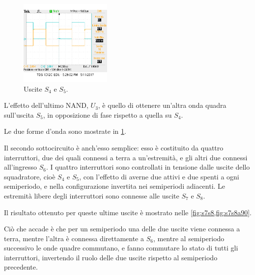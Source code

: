 \documentclass[a4paper,10pt]{article}
\begin{document}
\begin{figure}
	\vspace{-10pt}
	\centering
	\includegraphics[width=0.4\textwidth]{../grafici/s4s5.png}
	\vspace{-12pt}
	\caption{Uscite $ S_4 $ e $ S_5 $.}
	\label{fig:s4s5}
	\vspace{-12pt}
\end{figure}

\noindent L'effetto dell'ultimo NAND, $ U_3 $, è quello di ottenere un'altra onda quadra sull'uscita $ S_5 $, in opposizione di fase rispetto a quella su $ S_4 $.

Le due forme d'onda sono mostrate in \cref{fig:s4s5}.
\newline

Il secondo sottocircuito è anch'esso semplice: esso è costituito da quattro interruttori, due dei quali connessi a terra a un'estremità, e gli altri due connessi all'ingresso $ S_6 $.
I quattro interruttori sono controllati in tensione dalle uscite dello squadratore, cioè $ S_4 $ e $ S_5 $, con l'effetto di averne due attivi e due spenti a ogni semiperiodo, e nella configurazione invertita nei semiperiodi adiacenti.
Le estremità libere degli interruttori sono connesse alle uscite $ S_7 $ e $ S_8 $.
\newline

Il risultato ottenuto per queste ultime uscite è mostrato nelle \cref{fig:s7s8,fig:s7s8a90}.

Ciò che accade è che per un semiperiodo una delle due uscite viene connessa a terra, mentre l'altra è connessa direttamente a $ S_6 $, mentre al semiperiodo successivo le onde quadre commutano, e fanno commutare lo stato di tutti gli interruttori, invertendo il ruolo delle due uscite rispetto al semiperiodo precedente.
\end{document}
